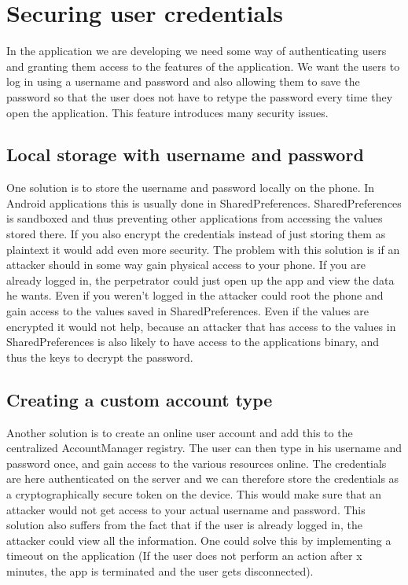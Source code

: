 \section{Securing user credentials}
In the application we are developing we need some way of authenticating users and granting them access to the features of the application. We want the users to log in using a username and password and also allowing them to save the password so that the user does not have to retype the password every time they open the application. This feature introduces many security issues. 

\subsection{Local storage with username and password}
One solution is to store the username and password locally on the phone. In Android applications this is usually done in SharedPreferences. SharedPreferences is sandboxed and thus preventing other applications from accessing the values stored there. If you also encrypt the credentials instead of just storing them as plaintext it would add even more security. 
\newline
\newline
The problem with this solution is if an attacker should in some way gain physical access to your phone. If you are already logged in, the perpetrator could just open up the app and view the data he wants. Even if you weren’t logged in the attacker could root the phone and gain access to the values saved in SharedPreferences. Even if the values are encrypted it would not help, because an attacker that has access to the values in SharedPreferences is also likely to have access to the applications binary, and thus the keys to decrypt the password.

\subsection{Creating a custom account type}
Another solution is to create an online user account and add this to the centralized AccountManager registry. The user can then type in his username and password once, and gain access to the various resources online. The credentials are here authenticated on the server and we can therefore store the credentials as a cryptographically secure token on the device. This would make sure that an attacker would not get access to your actual username and password. 
\newline
\newline
This solution also suffers from the fact that if the user is already logged in, the attacker could view all the information. One could solve this by implementing a timeout on the application (If the user does not perform an action after x minutes, the app is terminated and the user gets disconnected).


